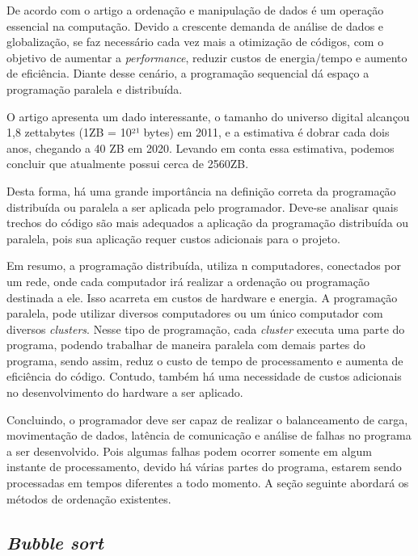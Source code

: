 \indent De acordo com o artigo \cite{Michael} a ordenação e manipulação de dados é um operação essencial na computação. Devido a crescente demanda de análise de dados e globalização, se faz necessário cada vez mais a otimização de códigos, com o objetivo de aumentar a \textit{performance}, reduzir custos de energia/tempo e aumento de eficiência. Diante desse cenário, a programação sequencial dá espaço a programação paralela e distribuída.

\indent O artigo \cite{Mapreduce} apresenta um dado interessante, o tamanho do universo digital alcançou 1,8 zettabytes (1ZB = 10²¹ bytes) em 2011, e a estimativa é dobrar cada dois anos, chegando a 40 ZB em 2020. Levando em conta essa estimativa, podemos concluir que atualmente possui cerca de 2560ZB. 

\indent Desta forma, há uma grande importância na definição correta da programação distribuída ou paralela a ser aplicada pelo programador. Deve-se analisar quais trechos do código são mais adequados a aplicação da programação distribuída ou paralela, pois sua aplicação requer custos adicionais para o projeto.

\indent Em resumo, a programação distribuída, utiliza n computadores, conectados por um rede, onde cada computador irá realizar a ordenação ou programação destinada a ele. Isso acarreta em custos de hardware e energia. A programação paralela, pode utilizar diversos computadores ou um único computador com diversos \textit{clusters}. Nesse tipo de programação, cada \textit{cluster} executa uma parte do programa, podendo trabalhar de maneira paralela com demais partes do programa, sendo assim, reduz o custo de tempo de processamento e aumenta de eficiência do código. Contudo, também há uma necessidade de custos adicionais no desenvolvimento do hardware a ser aplicado.

\indent Concluindo, o programador deve ser capaz de realizar o balanceamento de carga, movimentação de dados, latência de comunicação e análise de falhas no programa a ser desenvolvido. Pois algumas falhas podem ocorrer somente em algum instante de processamento, devido há várias partes do programa, estarem sendo processadas em tempos diferentes a todo momento. A seção seguinte abordará os métodos de ordenação existentes.

\subsection{\textit{Bubble sort}}\cite{zanoni,backes}

